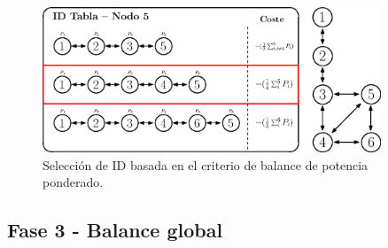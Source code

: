 \begin{figure}[ht!]
    \centering
    \includegraphics[width=0.9\textwidth]{fig/05_den2ne/den2ne_10.eps}
    \caption{Selección de ID basada en el criterio de balance de potencia ponderado.}
    \label{fig:den2ne_10}
\end{figure}


\subsection{Fase 3 - Balance global}
\label{subsec:fase3}

